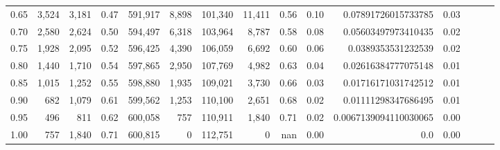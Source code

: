 \begin{tabular}{rrrrrrrrrrrrrrr}
0.65 &    3,524 &   3,181 &  0.47 &  591,917 &    8,898 &  101,340 &   11,411 &  0.56 &  0.10 &    0.07891726015733785 &      0.03 \\
0.70 &    2,580 &   2,624 &  0.50 &  594,497 &    6,318 &  103,964 &    8,787 &  0.58 &  0.08 &    0.05603497973410435 &      0.02 \\
0.75 &    1,928 &   2,095 &  0.52 &  596,425 &    4,390 &  106,059 &    6,692 &  0.60 &  0.06 &     0.0389353531232539 &      0.02 \\
0.80 &    1,440 &   1,710 &  0.54 &  597,865 &    2,950 &  107,769 &    4,982 &  0.63 &  0.04 &    0.02616384777075148 &      0.01 \\
0.85 &    1,015 &   1,252 &  0.55 &  598,880 &    1,935 &  109,021 &    3,730 &  0.66 &  0.03 &    0.01716171031742512 &      0.01 \\
0.90 &      682 &   1,079 &  0.61 &  599,562 &    1,253 &  110,100 &    2,651 &  0.68 &  0.02 &    0.01111298347686495 &      0.01 \\
0.95 &      496 &     811 &  0.62 &  600,058 &      757 &  110,911 &    1,840 &  0.71 &  0.02 &  0.0067139094110030065 &      0.00 \\
1.00 &      757 &   1,840 &  0.71 &  600,815 &        0 &  112,751 &        0 &   nan &  0.00 &                    0.0 &      0.00 \\
\bottomrule
\end{tabular}
